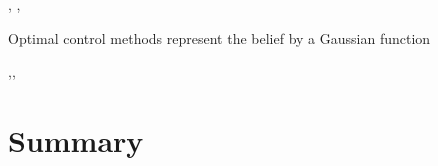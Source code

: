 \cite{Erez10ascalable},
\cite{mc_update_ppomdps}, 
\cite{Platt-RSS-10}

 

Optimal control methods represent the belief by a Gaussian function 


\cite{Bayesian_explor_exploit_2009},\cite{Spaan05icra},\cite{Thrun_2005}
 

\cite{Rand_belief_space_replanning}
 
 
 \cite{Ross08onlineplanning}
 
 \cite{Macro_uncertainty_2011}

\section{Summary}




